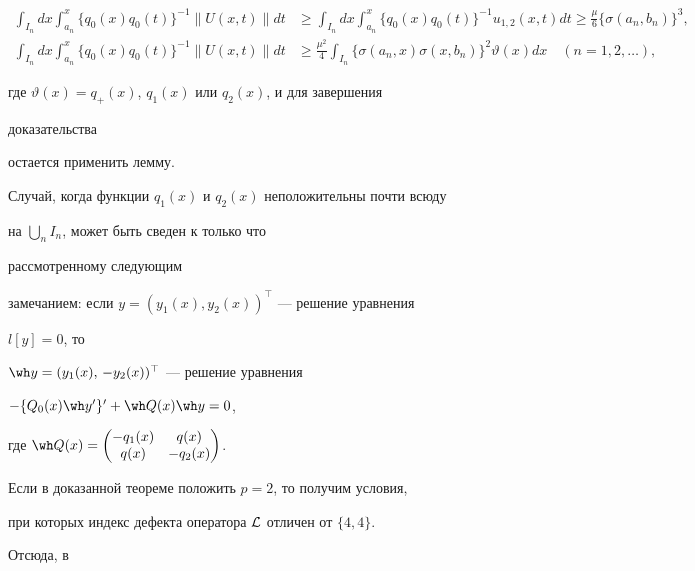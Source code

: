 \begin{pf}
\begin{align*}
\int_{I_n}d x\int^x_{a_n}\{q_0(x)q_0(t)\}^{-1} 


\|U(x,t)\|d t &\ge \int_{I_n}d x\int^x_{a_n} 


\{q_0(x)q_0(t)\}^{-1}u_{1,2}(x,t)d t\ge\frac{\mu}{6} 


\{\sigma(a_n,b_n)\}^3,\\ 


% 


\int_{I_n}d x\int^x_{a_n}\{q_0(x)q_0(t)\}^{-1} 


\|U(x,t)\|d t &\ge 


\frac{\mu^2}{4}\int_{I_n}\{\sigma(a_n,x)\sigma(x,b_n)\}^2\vartheta(x)d 


x\quad 


(n=1,2,\dotsc), 


\end{align*} 


где $\vartheta(x)=q_+(x)$, $q_1(x)$ или $q_2(x)$, и для завершения 


доказательства 


остается применить лемму. 


 


Случай, когда функции $q_1(x)$ и $q_2(x)$ неположительны почти всюду 


на $\bigcup\limits_n I_n$, может быть сведен к только что 


рассмотренному следующим 


замечанием: если $y=(y_1(x),y_2(x))^\top$ --- решение уравнения 


$l[y]=0$, то 


$\wh y=(y_1(x),\,-y_2(x))^\top$ --- решение уравнения 


$-\{Q_0(x)\wh y'\}'+\wh Q(x)\wh y=0$, 


где $\wh Q(x)=\begin{pmatrix} 


-q_1(x) & q(x) \\ q(x) & -q_2(x) 


\end{pmatrix}$. 


\end{pf} 


 


Если в доказанной теореме положить $p=2$, то получим условия, 


при которых индекс дефекта оператора $\cal L$ отличен от $\{4,4\}$. 


Отсюда, в 


